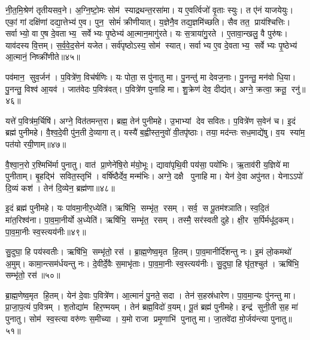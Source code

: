 नी॒त॒मि॒श्रेण॑ तृतीयसव॒ने।
अ॒ग्नि॒ष्टो॒मः सोम॑ स्याद्रथन्त॒रसा॑मा।
य ए॒वर्त्विजो॑ वृ॒ताः स्युः।
त ए॑नं याजयेयुः।
एकां॒ गां दक्षि॑णां दद्या॒त्तेभ्य॑ ए॒व।
पुन॒ सोमं॑ क्रीणीयात्।
य॒ज्ञेनै॒व तद्य॒ज्ञमि॑च्छति।
सैव तत॒ प्राय॑श्चित्तिः।
सर्वाभ्यो॒ वा ए॒ष दे॒वताभ्य॒ सर्वेभ्यः पृ॒ष्ठेभ्य॑ आ॒त्मान॒मागु॑रते।
यः स॒त्राया॑गु॒रते।
ए॒तावा॒न्खलु॒ वै पुरु॑षः।
याव॑दस्य वि॒त्तम्।
स॒र्व॒वे॒द॒सेन॑ यजेत।
सर्व॑पृष्ठोऽस्य॒ सोम॑ स्यात्।
सर्वाभ्य ए॒व दे॒वताभ्य॒ सर्वेभ्यः पृ॒ष्ठेभ्य॑ आ॒त्मानं॒ निष्क्री॑णीते॥४५॥\anuvakamend[उ॒द्वाय॑ति मन्थेन्मन्थत्यक्रामत्प॒राऽप॑तन्म॒ध्यन्दि॑न आगु॒रते॒ पञ्च॑ च]

पव॑मान॒ सुव॒र्जन॑।
प॒वित्रे॑ण॒ विच॑र्\mbox{}षणिः।
यः पोता॒ स पु॑नातु मा।
पु॒नन्तु॑ मा देवज॒नाः।
पु॒नन्तु॒ मन॑वो धि॒या।
पु॒नन्तु॒ विश्व॑ आ॒यव॑।
जात॑वेदः प॒वित्र॑वत्।
प॒वित्रे॑ण पुनाहि मा।
शु॒क्रेण॑ देव॒ दीद्य॑त्।
अग्ने॒ क्रत्वा॒ क्रतू॒ रनु॑॥४६॥

यत्ते॑ प॒वित्र॑म॒र्चिषि॑।
अग्ने॒ वित॑तमन्त॒रा।
ब्रह्म॒ तेन॑ पुनीमहे।
उ॒भाभ्यां देव सवितः।
प॒वित्रे॑ण स॒वेन॑ च।
इ॒दं ब्रह्म॑ पुनीमहे।
वै॒श्व॒दे॒वी पु॑न॒ती दे॒व्यागात्।
यस्यै॑ ब॒ह्वीस्त॒नुवो॑ वी॒तपृ॑ष्ठाः।
तया॒ मद॑न्तः सध॒माद्ये॑षु।
व॒य स्या॑म॒ पत॑यो रयी॒णाम्॥४७॥

वै॒श्वा॒न॒रो र॒श्मिभि॑र्मा पुनातु।
वात॑ प्रा॒णेने॑षि॒रो म॑यो॒भूः।
द्यावा॑पृथि॒वी पय॑सा॒ पयो॑भिः।
ऋ॒ताव॑री य॒ज्ञिये॑ मा पुनीताम्।
बृ॒हद्भि॑ सवित॒स्तृभि॑।
वर्\mbox{}षि॑ष्ठैर्देव॒ मन्म॑भिः।
अग्ने॒ दक्षै पुनाहि मा।
येन॑ दे॒वा अपु॑नत।
येनाऽऽपो॑ दि॒व्यं कश॑।
तेन॑ दि॒व्येन॒ ब्रह्म॑णा॥४८॥

इ॒दं ब्रह्म॑ पुनीमहे।
यः पा॑वमा॒नीर॒ध्येति॑।
ऋषि॑भि॒ सम्भृ॑त॒ रसम्।
सर्व॒ स पू॒तम॑श्ञाति।
स्व॒दि॒तं मा॑त॒रिश्व॑ना।
पा॒व॒मा॒नीर्यो अ॒ध्येति॑।
ऋषि॑भि॒ सम्भृ॑त॒ रसम्।
तस्मै॒ सर॑स्वती दुहे।
क्षी॒र स॒र्पिर्मधू॑द॒कम्।
पा॒व॒मा॒नीः स्व॒स्त्यय॑नीः॥४९॥

सु॒दुघा॒ हि पय॑स्वतीः।
ऋषि॑भि॒ सम्भृ॑तो॒ रस॑।
ब्रा॒ह्म॒णेष्व॒मृत हि॒तम्।
पा॒व॒मानीर्दि॑शन्तु नः।
इ॒मं लो॒कमथो॑ अ॒मुम्।
कामा॒न्त्सम॑र्धयन्तु नः।
दे॒वीर्दे॒वैः स॒माभृ॑ताः।
पा॒व॒मा॒नीः स्व॒स्त्यय॑नीः।
सु॒दुघा॒ हि घृ॑त॒श्चुत॑।
ऋषि॑भि॒ सम्भृ॑तो॒ रस॑॥५०॥

ब्रा॒ह्म॒णेष्व॒मृत हि॒तम्।
येन॑ दे॒वाः प॒वित्रे॑ण।
आ॒त्मानं॑ पु॒नते॒ सदा।
तेन॑ स॒हस्र॑धारेण।
पा॒व॒मा॒न्यः पु॑नन्तु मा।
प्रा॒जा॒प॒त्यं प॒वित्रम्।
श॒तोद्या॑म हिर॒ण्मयम्।
तेन॑ ब्रह्म॒विदो॑ व॒यम्।
पू॒तं ब्रह्म॑ पुनीमहे।
इन्द्र॑ सुनी॒ती स॒ह मा॑ पुनातु।
सोम॑ स्व॒स्त्या वरु॑णः स॒मीच्या।
य॒मो राजा प्रमृ॒णाभि॑ पुनातु मा।
जा॒तवे॑दा मो॒र्जय॑न्त्या पुनातु॥५१॥\anuvakamend[अनु॑ रयी॒णां ब्रह्म॑णा स्व॒स्त्यय॑नीः सु॒दुघा॒ हि घृ॑त॒श्चुत॒ ऋषि॑भि॒ सम्भृ॑तो॒ रस॑ पुनातु॒ त्रीणि॑ च]

